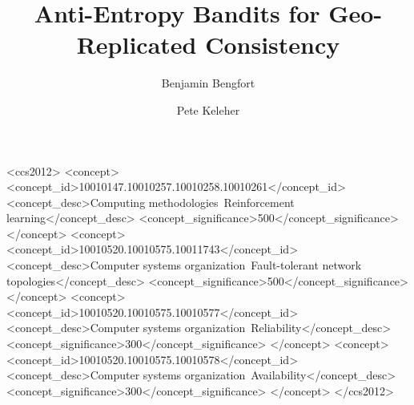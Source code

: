 \documentclass[sigconf]{acmart}
\begin{document}
\title{Anti-Entropy Bandits for Geo-Replicated Consistency}


\author{Benjamin Bengfort}

\author{Pete Keleher}


\begin{abstract}
    
\end{abstract}

%
%
\begin{CCSXML}
<ccs2012>
<concept>
<concept_id>10010147.10010257.10010258.10010261</concept_id>
<concept_desc>Computing methodologies~Reinforcement learning</concept_desc>
<concept_significance>500</concept_significance>
</concept>
<concept>
<concept_id>10010520.10010575.10011743</concept_id>
<concept_desc>Computer systems organization~Fault-tolerant network topologies</concept_desc>
<concept_significance>500</concept_significance>
</concept>
<concept>
<concept_id>10010520.10010575.10010577</concept_id>
<concept_desc>Computer systems organization~Reliability</concept_desc>
<concept_significance>300</concept_significance>
</concept>
<concept>
<concept_id>10010520.10010575.10010578</concept_id>
<concept_desc>Computer systems organization~Availability</concept_desc>
<concept_significance>300</concept_significance>
</concept>
</ccs2012>
\end{CCSXML}





\maketitle





\end{document}
